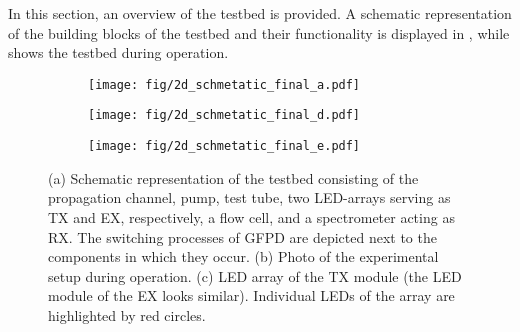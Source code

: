 In this section, an overview of the testbed is provided.
A schematic representation of the building blocks of the testbed and their functionality is displayed in , while  shows the testbed during operation. 
%
\begin{figure}[!tbp]
    \vspace{-0.5cm}

    \begin{subfigure}[t]{0.99\textwidth} %
        \caption{}
        \centering
        \texttt{[image: fig/2d\_schmetatic\_final\_a.pdf]}
        \label{fig:overview} 
    \end{subfigure}

    \vspace{-1.2cm} %


    \begin{subfigure}[t]{0.8\textwidth} 
        \caption{}
        \texttt{[image: fig/2d\_schmetatic\_final\_d.pdf]}        
        \label{fig:lab_overview}
    \end{subfigure}
    \hspace{0.05\textwidth} %
    \begin{subfigure}[t]{0.1\textwidth} %
        \caption{}
        \texttt{[image: fig/2d\_schmetatic\_final\_e.pdf]}
        \label{fig:led_array}
    \end{subfigure}
    
    \vspace{-0.5cm}
    \caption{(a) Schematic representation of the testbed consisting of the propagation channel, pump, test tube, two LED-arrays serving as \ac{TX} and \ac{EX}, respectively, a flow cell, and a spectrometer acting as \ac{RX}. The switching processes of \ac{GFPD} are depicted next to the components in which they occur. (b) Photo of the experimental setup during operation. (c) \ac{LED} array of the \ac{TX} module (the \ac{LED} module of the \ac{EX} looks similar). Individual \acp{LED} of the array are highlighted by red circles.}
    \label{fig:total_overview}
    \vspace*{-11mm}
\end{figure}
\scaleSubsection

